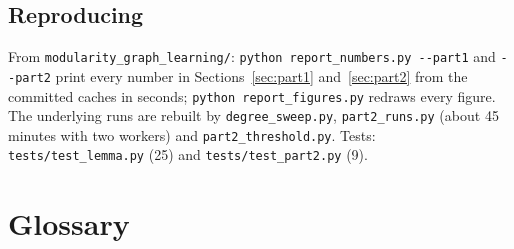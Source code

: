 \documentclass[11pt,a4paper]{article}
\theoremstyle{remark}
\begin{document}
\subsection{Reproducing}

From \texttt{modularity\_graph\_learning/}: \texttt{python report\_numbers.py -{}-part1}
and \texttt{-{}-part2} print every number in Sections~\ref{sec:part1}
and~\ref{sec:part2} from the committed caches in seconds; \texttt{python
report\_figures.py} redraws every figure. The underlying runs are rebuilt by
\texttt{degree\_sweep.py}, \texttt{part2\_runs.py} (about 45 minutes with two workers)
and \texttt{part2\_threshold.py}. Tests: \texttt{tests/test\_lemma.py} (25) and
\texttt{tests/test\_part2.py} (9).

\appendix
\section{Glossary}\label{app:glossary}
\end{document}
